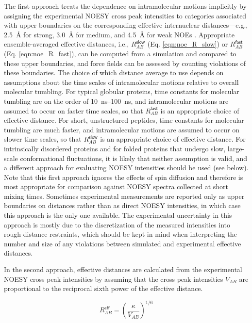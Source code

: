 \documentclass[9pt,review,pubversion]{livecoms}
\begin{document}
The first approach treats the dependence on intramolecular motions implicitly by assigning the experimental NOESY cross peak intensities to categories associated with upper boundaries on the corresponding effective internuclear distances---e.g., \qty{2.5}{\angstrom} for strong, \qty{3.0}{\angstrom} for medium, and \qty{4,5}{\angstrom} for weak NOEs \cite{smith_structure_1993}.
Appropriate ensemble-averaged effective distances, i.e., $R_{AB}^{\mathsf{slow}}$ (Eq. \ref{eqn:noe_R_slow}) or $R_{AB}^{\mathsf{fast}}$ (Eq. \ref{eqn:noe_R_fast}), can be computed from a simulation and compared to these upper boundaries, and force fields can be assessed by counting violations of these boundaries.
The choice of which distance average to use depends on assumptions about the time scales of intramolecular motions relative to overall molecular tumbling.
For typical globular proteins, time constants for molecular tumbling are on the order of \qtyrange{10}{100}{\nano\second}, and intramolecular motions are assumed to occur on faster time scales, so that $R_{AB}^{\mathsf{fast}}$ is an appropriate choice of effective distance.
For short, unstructured peptides, time constants for molecular tumbling are much faster, and intramolecular motions are assumed to occur on slower time scales, so that $R_{AB}^{\mathsf{slow}}$ is an appropriate choice of effective distance.
For intrinsically disordered proteins and for folded proteins that undergo slow, large-scale conformational fluctuations, it is likely that neither assumption is valid, and a different approach for evaluating NOESY intensities should be used (see below).
Note that this first approach ignores the effects of spin diffusion and therefore is most appropriate for comparison against NOESY spectra collected at short mixing times.
Sometimes experimental measurements are reported only as upper boundaries on distances rather than as direct NOESY intensities, in which case this approach is the only one available.
The experimental uncertainty in this approach is mostly due to the discretization of the measured intensities into rough distance restraints, which should be kept in mind when interpreting the number and size of any violations between simulated and experimental effective distances.

In the second approach, effective distances are calculated from the experimental NOESY cross peak intensities by assuming that the cross peak intensities $V_{AB}$ are proportional to the reciprocal sixth power of the effective distance.

\begin{equation}
\label{eqn:noesy_sixth_power}
R_{AB}^{\mathsf{eff}} = \left( \frac {\kappa} {V_{AB}} \right)^{1/6}
\end{equation}
\end{document}
